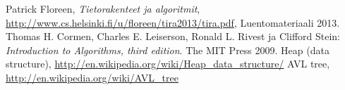 \documentclass[11pt,a4paper]{article}
\begin{document}
\begin{thebibliography}{9}
 Patrick Floreen, \emph{Tietorakenteet ja algoritmit}, \newline
\url{http://www.cs.helsinki.fi/u/floreen/tira2013/tira.pdf}, \newline Luentomateriaali 2013.
Thomas H. Cormen, Charles E. Leiserson, Ronald L. Rivest ja Clifford Stein:
\emph{Introduction to Algorithms, third edition}. 
The MIT Press 2009.
Heap (data structure), \newline
\url{http://en.wikipedia.org/wiki/Heap_data_structure/}
 AVL tree, \newline
\url{http://en.wikipedia.org/wiki/AVL_tree}
\end{thebibliography}
\end{document}
